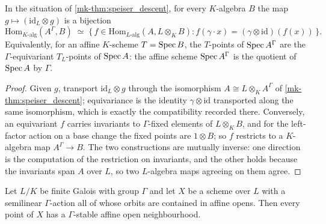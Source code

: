 \begin{theorem}\label{mk-thm:galois_quotient_points}
  \leanok

  In the situation of \ref{mk-thm:speiser_descent}, for every \(K\)-algebra \(B\)
  the map \(g \mapsto (\mathrm{id}_L \otimes g)\) is a bijection
  \[
    \mathrm{Hom}_{K\text{-alg}}(A^\Gamma, B)
      \;\simeq\;
    \{\, f \in \mathrm{Hom}_{L\text{-alg}}(A, L \otimes_K B) :
       f(\gamma \cdot x) = (\gamma \otimes \mathrm{id})(f(x)) \,\}.
  \]
  Equivalently, for an affine \(K\)-scheme \(T = \operatorname{Spec} B\), the \(T\)-points of
  \(\operatorname{Spec} A^\Gamma\) are the \(\Gamma\)-equivariant \(T_L\)-points of
  \(\operatorname{Spec} A\): the affine scheme \(\operatorname{Spec} A^\Gamma\) is the quotient of
  \(\operatorname{Spec} A\) by \(\Gamma\).
\end{theorem}

\begin{proof}
  \leanok{}
  Given \(g\), transport \(\mathrm{id}_L \otimes g\) through the isomorphism
  \(A \cong L \otimes_K A^\Gamma\) of \ref{mk-thm:speiser_descent}; equivariance is
  the identity \(\gamma \otimes \mathrm{id}\) transported along the same
  isomorphism, which is exactly the compatibility recorded there. Conversely, an
  equivariant \(f\) carries invariants to \(\Gamma\)-fixed elements of
  \(L \otimes_K B\), and for the left-factor action on a base change the fixed
  points are \(1 \otimes B\); so \(f\) restricts to a \(K\)-algebra map
  \(A^\Gamma \to B\). The two constructions are mutually inverse: one direction
  is the computation of the restriction on invariants, and the other holds
  because the invariants span \(A\) over \(L\), so two \(L\)-algebra maps
  agreeing on them agree.
\end{proof}

\begin{lemma}\label{mk-lem:stable_affine_open}
  \leanok

  Let \(L/K\) be finite Galois with group \(\Gamma\) and let \(X\) be a scheme
  over \(L\) with a semilinear \(\Gamma\)-action all of whose orbits are
  contained in affine opens. Then every point of \(X\) has a \(\Gamma\)-stable
  affine open neighbourhood.
\end{lemma}

